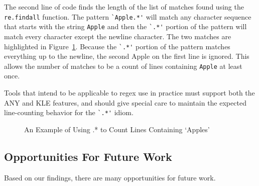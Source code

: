 The second line of code finds the length of the list of matches found using the {\tt re.findall} function.  The pattern \verb!`Apple.*'! will match any character sequence that starts with the string {\tt Apple} and then the \verb!`.*'! portion of the pattern will match every character except the newline character.  The two matches are highlighted in Figure~\ref{fig:lineSearch}. Because the \verb!`.*'! portion of the pattern matches everything up to the newline, the second Apple on the first line is ignored.  This allows the number of matches to be a count of lines containing {\tt Apple} at least once.

Tools that intend to be applicable to regex use in practice must support both the ANY and KLE features, and should give special care to maintain the expected line-counting behavior for the \verb!`.*'! idiom.



\begin{figure}[tb]
\centering
{}
\caption{An Example of Using .* to Count Lines Containing `Apples'}
\label{fig:lineSearch}
\end{figure}
\leavevmode\color{black}

\subsection{Opportunities For Future Work}

Based on our findings, there are many opportunities for future work.
\leavevmode\color{gray}
